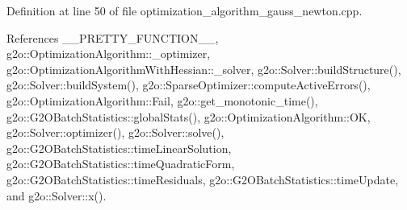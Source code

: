 Definition at line 50 of file optimization\+\_\+algorithm\+\_\+gauss\+\_\+newton.\+cpp.



References \+\_\+\+\_\+\+P\+R\+E\+T\+T\+Y\+\_\+\+F\+U\+N\+C\+T\+I\+O\+N\+\_\+\+\_\+, g2o\+::\+Optimization\+Algorithm\+::\+\_\+optimizer, g2o\+::\+Optimization\+Algorithm\+With\+Hessian\+::\+\_\+solver, g2o\+::\+Solver\+::build\+Structure(), g2o\+::\+Solver\+::build\+System(), g2o\+::\+Sparse\+Optimizer\+::compute\+Active\+Errors(), g2o\+::\+Optimization\+Algorithm\+::\+Fail, g2o\+::get\+\_\+monotonic\+\_\+time(), g2o\+::\+G2\+O\+Batch\+Statistics\+::global\+Stats(), g2o\+::\+Optimization\+Algorithm\+::\+OK, g2o\+::\+Solver\+::optimizer(), g2o\+::\+Solver\+::solve(), g2o\+::\+G2\+O\+Batch\+Statistics\+::time\+Linear\+Solution, g2o\+::\+G2\+O\+Batch\+Statistics\+::time\+Quadratic\+Form, g2o\+::\+G2\+O\+Batch\+Statistics\+::time\+Residuals, g2o\+::\+G2\+O\+Batch\+Statistics\+::time\+Update, and g2o\+::\+Solver\+::x().


